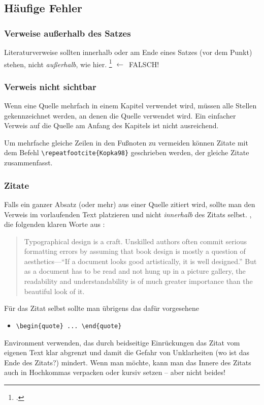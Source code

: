 \subsection{Häufige Fehler}

\subsubsection{Verweise außerhalb des Satzes}
Literaturverweise sollten innerhalb oder am Ende eines Satzes (vor
dem Punkt) stehen, nicht \emph{außerhalb}, wie
hier. \footcite[siehe][]{Oetiker01} $\leftarrow$~FALSCH!

\subsubsection{Verweis nicht sichtbar}
Wenn eine Quelle mehrfach in einem Kapitel verwendet wird, müssen alle Stellen gekennzeichnet werden, an denen die Quelle verwendet wird. Ein einfacher Verweis auf die Quelle am Anfang des Kapitels ist nicht ausreichend.

Um mehrfache gleiche Zeilen in den Fußnoten zu vermeiden können Zitate mit dem Befehl \verb|\repeatfootcite{Kopka98}| geschrieben werden, der gleiche Zitate zusammenfasst.

\subsubsection{Zitate}
Falls ein ganzer Absatz (oder mehr) aus einer Quelle zitiert wird,
sollte man den Verweis im vorlaufenden Text platzieren und nicht
\emph{innerhalb} des Zitats selbst. \ZB, die folgenden klaren Worte
aus :
\begin{quote}
Typographical design is a craft. Unskilled authors often commit
serious formatting errors by assuming that book design is mostly a
question of aesthetics---``If a document looks good artistically,
it is well designed.'' But as a document has to be read and not
hung up in a picture gallery, the readability and
understandability is of much greater importance than the beautiful
look of it.
\end{quote}
Für das Zitat selbst sollte man übrigens das dafür vorgesehene
%
\begin{itemize}
 \item[] \verb!\begin{quote} ... \end{quote}!
\end{itemize}
%
Environment verwenden, das durch beidseitige Einrückungen das
Zitat vom eigenen Text klar abgrenzt und damit die Gefahr von
Unklarheiten (wo ist das Ende des Zitats?) mindert.
Wenn man möchte, kann man das Innere des Zitats auch in Hochkommas verpacken oder kursiv setzen -- aber nicht beides!


